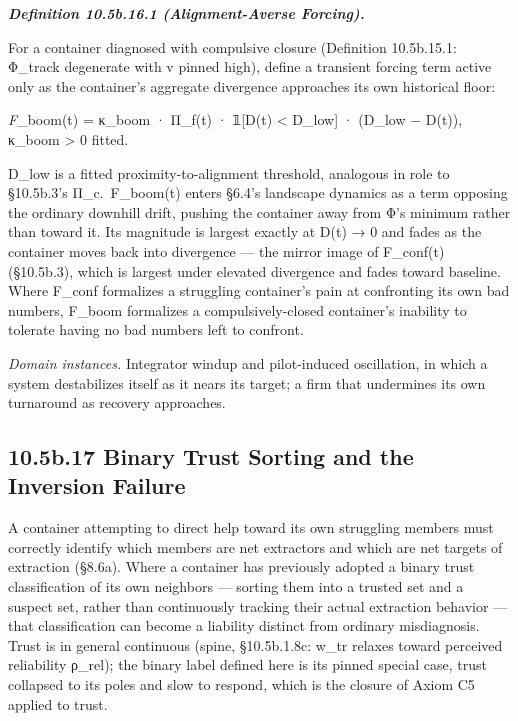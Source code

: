 \documentclass[
]{article}
\begin{document}
\emph{\textbf{Definition 10.5b.16.1 (Alignment-Averse Forcing).}}

For a container diagnosed with compulsive closure (Definition
10.5b.15.1: Φ\_track degenerate with v pinned high), define a transient
forcing term active only as the container's aggregate divergence
approaches its own historical floor:

\emph{F}\_boom(t) = κ\_boom · Π\_f(t) · 𝟙{[}D(t) \textless{} D\_low{]} ·
(D\_low − D(t)), κ\_boom \textgreater{} 0 fitted.

D\_low is a fitted proximity-to-alignment threshold, analogous in role
to §10.5b.3's Π\_c.~F\_boom(t) enters §6.4's landscape dynamics as a
term opposing the ordinary downhill drift, pushing the container away
from Φ's minimum rather than toward it. Its magnitude is largest exactly
at D(t) → 0 and fades as the container moves back into divergence ---
the mirror image of F\_conf(t) (§10.5b.3), which is largest under
elevated divergence and fades toward baseline. Where F\_conf formalizes
a struggling container's pain at confronting its own bad numbers,
F\_boom formalizes a compulsively-closed container's inability to
tolerate having no bad numbers left to confront.

\emph{Domain instances.} Integrator windup and pilot-induced
oscillation, in which a system destabilizes itself as it nears its
target; a firm that undermines its own turnaround as recovery
approaches.

\hypertarget{b.17-binary-trust-sorting-and-the-inversion-failure}{%
\subsection{10.5b.17 Binary Trust Sorting and the Inversion
Failure}\label{b.17-binary-trust-sorting-and-the-inversion-failure}}

A container attempting to direct help toward its own struggling members
must correctly identify which members are net extractors and which are
net targets of extraction (§8.6a). Where a container has previously
adopted a binary trust classification of its own neighbors --- sorting
them into a trusted set and a suspect set, rather than continuously
tracking their actual extraction behavior --- that classification can
become a liability distinct from ordinary misdiagnosis. Trust is in
general continuous (spine, §10.5b.1.8c: w\_tr relaxes toward perceived
reliability ρ\_rel); the binary label defined here is its pinned special
case, trust collapsed to its poles and slow to respond, which is the
closure of Axiom C5 applied to trust.
\end{document}
